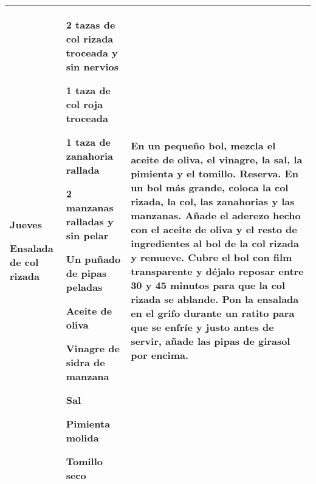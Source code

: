 \documentclass[menu.tex]{subfiles}
\begin{document}
\begin{tabular} {p{3cm} p{4.5cm} p{9cm}}
\pbox{20cm}
{
    \rule{0pt}{3ex}\begin{large}\textbf{Jueves}\end{large}\\ 
    \rule{0pt}{2ex}Ensalada de \\col rizada 
} & 
\vspace{-0.6cm}
\begin{compactitem} 
    \begin{scriptsize}
        \item 2 tazas de col rizada troceada y sin nervios
        \item 1 taza de col roja troceada
        \item 1 taza de zanahoria rallada
        \item 2 manzanas ralladas y sin pelar
        \item Un puñado de pipas peladas
        \item Aceite de oliva
        \item Vinagre de sidra de manzana
        \item Sal
        \item Pimienta molida
        \item Tomillo seco
    \end{scriptsize}
\end{compactitem}&
\vspace{-0.6cm}
En un pequeño bol, mezcla el aceite de oliva, el vinagre, la sal, la pimienta y el tomillo. Reserva.
En un bol más grande, coloca la col rizada, la col, las zanahorias y las manzanas.
Añade el aderezo hecho con el aceite de oliva y el resto de ingredientes al bol de la col rizada y remueve.
Cubre el bol con film transparente y déjalo reposar entre 30 y 45 minutos para que la col rizada se ablande.
Pon la ensalada en el grifo durante un ratito para que se enfríe y justo antes de servir, añade las pipas de girasol por encima.\\
\hline


\end{tabular}
\end{document}
